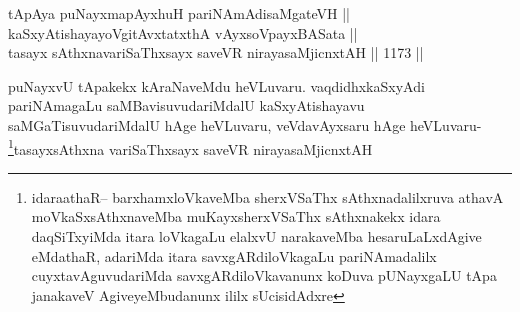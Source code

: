 \begin{shl}
tApAya puNayxmapAyxhuH pariNAmAdisaMgateVH || \\
kaSxyAtishayayoVgitAvxtatxthA vAyxsoV\s payxBASata || \\
tasayx sAthxnavariSaThxsayx saveVR nirayasaMjicnxtAH ||  1173 ||  
\end{shl}	

\begin{artha}
puNayxvU tApakekx kAraNaveMdu heVLuvaru. vaqdidhxkaSxyAdi pariNAmagaLu saMBavisuvudariMdalU kaSxyAtishayavu saMGaTisuvudariMdalU hAge heVLuvaru, veVdavAyxsaru hAge heVLuvaru-\\
\footnote[1]{idaraathaR-- barxhamxloVkaveMba sherxVSaThx sAthxnadalilxruva athavA moVkaSxsAthxnaveMba muKayxsherxVSaThx sAthxnakekx idara daqSiTxyiMda itara loVkagaLu elalxvU narakaveMba hesaruLaLxdAgive eMdathaR, adariMda itara savxgARdiloVkagaLu pariNAmadalilx cuyxtavAguvudariMda savxgARdiloVkavanunx koDuva pUNayxgaLU tApa janakaveV AgiveyeMbudanunx ililx sUcisidAdxre}tasayxsAthxna variSaThxsayx saveVR nirayasaMjicnxtAH
\end{artha}
